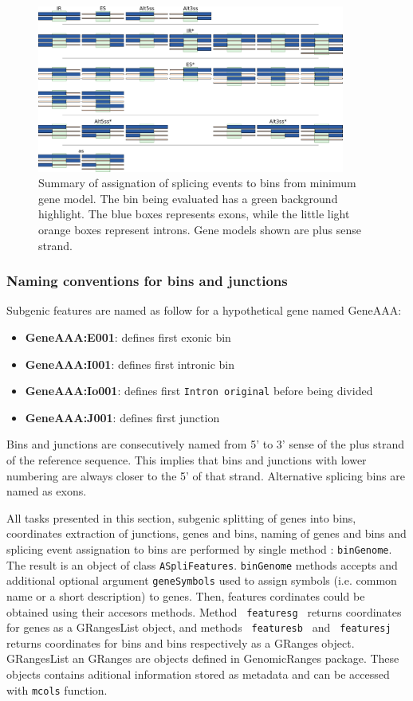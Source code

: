 \documentclass{article}
\begin{document}
\begin{figure}[ht!]
\centering
\includegraphics[width=0.9\textwidth]{images/event_assignment.pdf}
\caption{ Summary of assignation of splicing events to bins from minimum gene
model. The bin being evaluated has a green background highlight. The blue boxes
represents exons, while the little light orange boxes represent introns. Gene
models shown are plus sense strand. }
\label{fig:binAssignation}
\end{figure}



\subsubsection{Naming conventions for bins and junctions }
\label{sec:binNaming}
Subgenic features are named as follow for a hypothetical gene named GeneAAA:
\begin{itemize}
  \item \textbf{GeneAAA:E001}: defines first exonic bin
  \item \textbf{GeneAAA:I001}: defines first intronic bin
  \item \textbf{GeneAAA:Io001}: defines first \texttt{Intron original} before 
  being divided
  \item \textbf{GeneAAA:J001}: defines first junction
\end{itemize}

Bins and junctions are consecutively named from 5' to 3' sense of the plus
strand of the reference sequence. This implies that  bins and junctions with
lower numbering are always closer to the 5' of that strand. Alternative splicing
bins are named as exons.

All tasks presented in this section, subgenic splitting of genes into
bins, coordinates extraction of junctions, genes and bins, naming of genes and
bins and splicing event assignation to bins are performed by single method
: \texttt{binGenome}. The result is an object of class \texttt{ASpliFeatures}.
\texttt{binGenome} methods accepts and additional optional argument
\texttt{geneSymbols} used to assign symbols (i.e. common name or a short
description) to genes.
Then, features cordinates could be obtained using their accesors methods.
Method \texttt{ featuresg } returns coordinates for genes as a GRangesList
object, and methods \texttt{ featuresb } and \texttt{ featuresj } returns
coordinates for bins and bins respectively as a GRanges object. GRangesList an
GRanges are objects defined in GenomicRanges package. These objects contains
aditional information stored as metadata and can be accessed with \texttt{mcols}
function.
\end{document}
